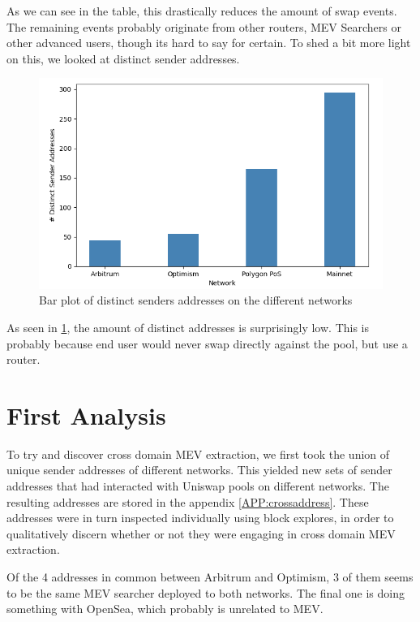 As we can see in the table, this drastically reduces the amount of swap events. The remaining events probably originate from other routers, MEV Searchers or other advanced users, though its hard to say for certain. To shed a bit more light on this, we looked at distinct sender addresses. 

\begin{figure}[H]
    \centering
    \includegraphics[width=\textwidth]{3_FIGURES/Results/DistinctAddresses.PNG}
    \caption{Bar plot of distinct senders addresses on the different networks}
    \label{bardistintcaddr}
\end{figure}

As seen in \ref{bardistintcaddr}, the amount of distinct addresses is surprisingly low. This is probably because end user would never swap directly against the pool, but use a router. 

\section{First Analysis}

To try and discover cross domain MEV extraction, we first took the union of unique sender addresses of different networks. This yielded new sets of sender addresses that had interacted with Uniswap pools on different networks. The resulting addresses are stored in the appendix \ref{APP:crossaddress}. These addresses were in turn inspected individually using block explores, in order to qualitatively discern whether or not they were engaging in cross domain MEV extraction.

Of the 4 addresses in common between Arbitrum and Optimism, 3 of them seems to be the same MEV searcher deployed to both networks. The final one is doing something with OpenSea, which probably is unrelated to MEV.

